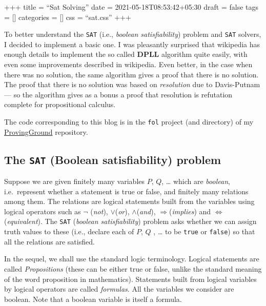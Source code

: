 +++ title = ``Sat Solving'' date = 2021-05-18T08:53:42+05:30 draft =
false tags = {[}{]} categories = {[}{]} css = ``sat.css'' +++

To better understand the \texttt{SAT} (i.e., \emph{boolean
satisfiability}) problem and \texttt{SAT} solvers, I decided to
implement a basic one. I was pleasantly surprised that wikipedia has
enough details to implement the so called \textbf{DPLL} algorithm quite
easily, with even some improvements described in wikipedia. Even better,
in the case when there was no solution, the same algorithm gives a proof
that there is no solution. The proof that there is no solution was based
on \emph{resolution} due to Davis-Putnam --- so the algorithm gives as a
bonus a proof that resolution is refutation complete for propositional
calculus.

The code corresponding to this blog is in the \texttt{fol} project (and
directory) of my
\href{https://github.com/siddhartha-gadgil/ProvingGround}{ProvingGround}
repository.

\hypertarget{the-sat-boolean-satisfiability-problem}{%
\subsection{\texorpdfstring{The \texttt{SAT} (Boolean satisfiability)
problem}{The SAT (Boolean satisfiability) problem}}\label{the-sat-boolean-satisfiability-problem}}

Suppose we are given finitely many variables \(P\), \(Q\), \ldots{}
which are \emph{boolean}, i.e.~represent whether a statement is true or
false, and finitely many relations among them. The relations are logical
statements built from the variables using logical operators such as
\(\neg\) (\emph{not}), \(\vee\)(\emph{or}), \(\wedge\)(\emph{and}),
\(\Rightarrow\)(\emph{implies}) and \(\Leftrightarrow\)
(\emph{equivalent}). The \texttt{SAT} (\emph{boolean satisfiability})
problem asks whether we can assign truth values to these (i.e., declare
each of \(P\), \(Q\) , \ldots{} to be \texttt{true} or \texttt{false})
so that all the relations are satisfied.

In the sequel, we shall use the standard logic terminology. Logical
statements are called \emph{Propositions} (these can be either true or
false, unlike the standard meaning of the word proposition in
mathematics). Statements built from logical variables by logical
operators are called \emph{formulas}. All the variables we consider are
boolean. Note that a boolean variable is itself a formula.

